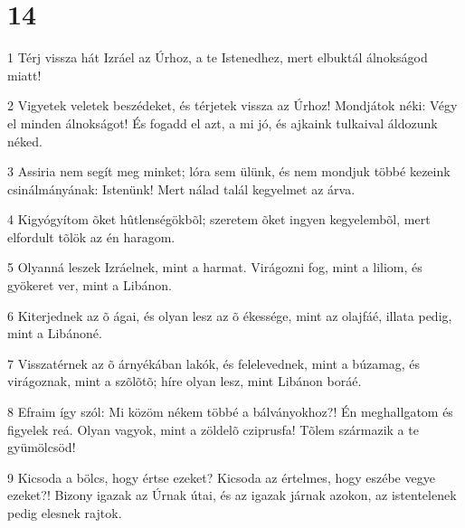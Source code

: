 \chapter{14}

\par 1 Térj vissza hát Izráel az Úrhoz, a te Istenedhez, mert elbuktál álnokságod miatt!
\par 2 Vigyetek veletek beszédeket, és térjetek vissza az Úrhoz! Mondjátok néki: Végy el minden álnokságot! És fogadd el azt, a mi jó, és ajkaink tulkaival áldozunk néked.
\par 3 Assiria nem segít meg minket; lóra sem ülünk, és nem mondjuk többé kezeink csinálmányának: Istenünk! Mert nálad talál kegyelmet az árva.
\par 4 Kigyógyítom õket hûtlenségökbõl; szeretem õket ingyen kegyelembõl, mert elfordult tõlök az én haragom.
\par 5 Olyanná leszek Izráelnek, mint a harmat. Virágozni fog, mint a liliom, és gyökeret ver, mint a Libánon.
\par 6 Kiterjednek az õ ágai, és olyan lesz az õ ékessége, mint az olajfáé, illata pedig, mint a Libánoné.
\par 7 Visszatérnek az õ árnyékában lakók, és felelevednek, mint a búzamag,  és virágoznak, mint a szõlõtõ; híre olyan lesz, mint Libánon boráé.
\par 8 Efraim így szól: Mi közöm nékem többé a bálványokhoz?! Én meghallgatom és figyelek reá. Olyan vagyok, mint a zöldelõ cziprusfa! Tõlem származik a te gyümölcsöd!
\par 9 Kicsoda a bölcs, hogy értse ezeket? Kicsoda az értelmes, hogy eszébe vegye ezeket?! Bizony igazak az Úrnak útai, és az igazak járnak azokon, az istentelenek pedig elesnek  rajtok.


